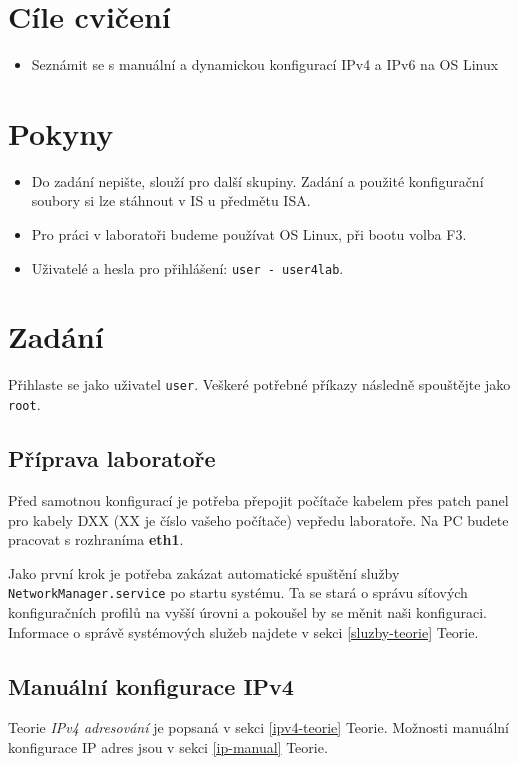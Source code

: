\section*{Cíle cvičení}
\begin{itemize}
    \item Seznámit se s manuální a dynamickou konfigurací IPv4 a IPv6 na OS Linux
\end{itemize}

\section*{Pokyny}
\begin{itemize}
    \item Do zadání nepište, slouží pro další skupiny. Zadání a použité
        konfigurační soubory si lze stáhnout v IS u předmětu ISA.
    \item Pro práci v laboratoři budeme používat OS Linux, při bootu volba F3.
    \item Uživatelé a hesla pro přihlášení: \texttt{user - user4lab}.
\end{itemize}

\section{Zadání}
Přihlaste se jako uživatel \texttt{user}. Veškeré potřebné příkazy následně
spouštějte jako \texttt{root}.

\subsection{Příprava laboratoře}
Před samotnou konfigurací je potřeba přepojit počítače kabelem přes patch panel
pro kabely DXX (XX je číslo vašeho počítače) vepředu laboratoře. Na PC budete
pracovat s rozhraníma {\bf eth1}.

Jako první krok je potřeba zakázat automatické spuštění služby \texttt{NetworkManager.service} po startu systému. Ta
se stará o správu síťových konfiguračních profilů na vyšší úrovni a pokoušel by
se měnit naši konfiguraci. Informace o správě systémových služeb najdete v
sekci \ref{sluzby-teorie} Teorie.

\subsection{Manuální konfigurace IPv4}

Teorie \emph{IPv4 adresování} je popsaná v sekci \ref{ipv4-teorie} Teorie.
Možnosti manuální konfigurace IP adres jsou v sekci \ref{ip-manual} Teorie.

